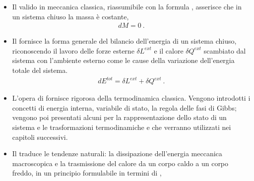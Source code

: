 \documentclass[letterpaper,10pt,italian]{jupyterBook}
\begin{document}
\begin{itemize}
\item {} 
\sphinxAtStartPar
Il {\hyperref[\detokenize{ch/thermodynamics/principles-lavoisier:physics-hs-thermodynamics-foundation-principles-lavoisier}]{}} valido in meccanica classica, riassumibile con la formula , asserisce che in un sistema chiuso la massa è costante,
\begin{equation*}
\begin{split}d M = 0 \ .\end{split}
\end{equation*}
\item {} 
\sphinxAtStartPar
Il {\hyperref[\detokenize{ch/thermodynamics/principles-first:physics-hs-thermodynamics-foundation-principles-first}]{}} fornisce la forma generale del bilancio dell’energia  di un sistema chiuso, riconoscendo il lavoro delle forze esterne \(\delta L^{ext}\) e il calore \(\delta Q^{ext}\) scambiato dal sistema con l’ambiente esterno come le cause della variazione dell’energia totale del sistema.
\begin{equation*}
\begin{split}d E^{tot} = \delta L^{ext} + \delta Q^{ext} \ .\end{split}
\end{equation*}
\item {} 
\sphinxAtStartPar
L’opera di  fornisce {\hyperref[\detokenize{ch/thermodynamics/principles-gibbs-phase-rule:physics-hs-thermodynamics-foundation-principles-gibbs-phase-rule}]{}} rigorosa della termodinamica classica. Vengono introdotti i concetti di energia interna, variabile di stato, la regola delle fasi di Gibbs; vengono poi presentati alcuni {\hyperref[\detokenize{ch/thermodynamics/principles-phase-diagrams:physics-hs-thermodynamics-foundation-principles-phase-diagrams}]{}} per la rappresentazione dello stato di un sistema e le trasformazioni termodinamiche e che verranno utilizzati nei capitoli successivi.

\item {} 
\sphinxAtStartPar
Il  traduce le tendenze naturali: la dissipazione dell’energia meccanica macroscopica e la trasmissione del calore da un corpo caldo a un corpo freddo, in un principio formulabile in termini di ,

\end{itemize}
\end{document}
